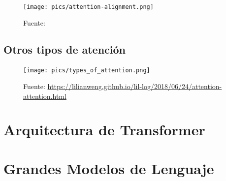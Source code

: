 \documentclass{book}
\begin{document}
\begin{figure}[h]
  \centering
  \texttt{[image: pics/attention-alignment.png]}
  \caption{Fuente: \cite{cho2015describing}}
\end{figure}


\section{Otros tipos de atención}
\begin{figure}[h]
  \centering
  \texttt{[image: pics/types\_of\_attention.png]}
  \caption{Fuente: \url{https://lilianweng.github.io/lil-log/2018/06/24/attention-attention.html}}
\end{figure}

\chapter{Arquitectura de Transformer}
\label{cap_trans}




        
        
\chapter{Grandes Modelos de Lenguaje}
\label{cap_llm}









\end{document}
